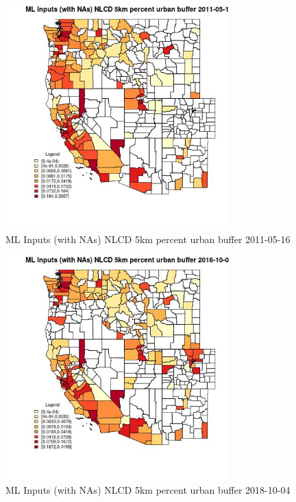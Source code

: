 \begin{figure} 
\centering  
\includegraphics[width=0.77\textwidth]{Code_Outputs/Report_ML_input_PM25_Step4_part_f_de_duplicated_aveswNAs_CountyNLCD_5km_percent_urban_bufferMean2011-05-16.jpg} 
\caption{\label{fig:Report_ML_input_PM25_Step4_part_f_de_duplicated_aveswNAsCountyNLCD_5km_percent_urban_bufferMean2011-05-16}ML Inputs (with NAs) NLCD 5km percent urban buffer 2011-05-16} 
\end{figure} 
 

\clearpage 

\begin{figure} 
\centering  
\includegraphics[width=0.77\textwidth]{Code_Outputs/Report_ML_input_PM25_Step4_part_f_de_duplicated_aveswNAs_CountyNLCD_5km_percent_urban_bufferMean2018-10-04.jpg} 
\caption{\label{fig:Report_ML_input_PM25_Step4_part_f_de_duplicated_aveswNAsCountyNLCD_5km_percent_urban_bufferMean2018-10-04}ML Inputs (with NAs) NLCD 5km percent urban buffer 2018-10-04} 
\end{figure} 
 

